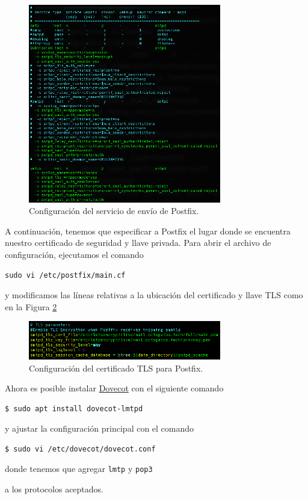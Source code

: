 \documentclass{article}
\newcommand{\ttt}[1]{%
\texttt{#1}%
}
\begin{document}
\begin{figure}[H]
  \centering
  \includegraphics[width=0.75\textwidth]{email/postfixSub}
  \caption{Configuraci\'on del servicio de env\'io de Postfix.}
  \label{fig:email-postfixSub}
\end{figure}

A continuaci\'on, tenemos que especificar a Postfix
el lugar donde se encuentra nuestro certificado de
seguridad y llave privada.   Para abrir el archivo
de configuraci\'on, ejecutamos el comando
\begin{lstlisting}
sudo vi /etc/postfix/main.cf
\end{lstlisting}
y modificamos las l\'ineas relativas a la ubicaci\'on
del certificado y llave TLS como en la Figura
\ref{fig:email-tlsLocation}

\begin{figure}[H]
  \centering
  \includegraphics[width=0.75\textwidth]{email/tlsLocation}
  \caption{Configuraci\'on del certificado TLS para Postfix.}
  \label{fig:email-tlsLocation}
\end{figure}

Ahora es posible instalar
\href{https://www.dovecot.org/}{Dovecot} con el
siguiente comando
\begin{lstlisting}
$ sudo apt install dovecot-lmtpd
\end{lstlisting}
y ajustar la configuraci\'on principal con
el comando
\begin{lstlisting}
$ sudo vi /etc/dovecot/dovecot.conf
\end{lstlisting}
donde tenemos que agregar \ttt{lmtp} y \ttt{pop3}
a los protocolos aceptados.
\end{document}
